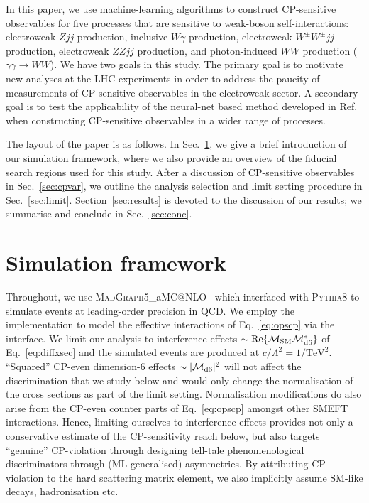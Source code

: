 \documentclass[twocolumn,preprintnumbers,superscriptaddress,nofootinbib,aps,prd,floatfix]{revtex4}
\makeatletter
\newcommand{\mg}{\textsc{MadGraph5\_}aMC@NLO}
\newcommand{\pythia}{\textsc{Pythia8}}
\makeatother
\begin{document}
In this paper, we use machine-learning algorithms to construct CP-sensitive observables for five processes that are sensitive to weak-boson self-interactions: electroweak $Zjj$ production, inclusive $W\gamma$ production, electroweak $W^\pm W^\pm jj$ production, electroweak $ZZjj$ production, and photon-induced $WW$ production ($\gamma\gamma\rightarrow WW$). We have two goals in this study. The primary goal is to motivate new analyses at the LHC experiments in order to address the paucity of measurements of CP-sensitive observables in the electroweak sector. A secondary goal is to test the applicability of the neural-net based method developed in Ref.~\cite{Bhardwaj:2021ujv} when constructing CP-sensitive observables in a wider range of processes. 

The layout of the paper is as follows. In Sec.~\ref{sec:mc}, we give a brief 
introduction of our simulation framework, where we also provide an overview 
of the fiducial search regions used for this study.
After a discussion 
of CP-sensitive observables in Sec.~\ref{sec:cpvar}, we outline the analysis 
selection and limit setting procedure in Sec.~\ref{sec:limit}. 
Section~\ref{sec:results} is devoted to the discussion of our results; we 
summarise and conclude in Sec.~\ref{sec:conc}.

\section{Simulation framework}
\label{sec:mc}
Throughout, we use \mg{}~\cite{Alwall:2014hca} which interfaced with \pythia{} \cite{Sjostrand:2007gs,Sjostrand:2014zea} to simulate events at leading-order precision in QCD. We employ the {}~\cite{Brivio:2017btx,Brivio:2020onw} implementation to model the effective interactions of Eq.~\eqref{eq:opscp} via the {}~\cite{Degrande:2011ua} interface. We limit our analysis to interference effects $\sim \hbox{Re}\{{\cal{M}}_{\text{SM}}{\cal{M}}_{\text{d6}}^\ast \}$ of Eq.~\eqref{eq:diffxsec} and the simulated events are produced at $c/\Lambda^2 = 1/\text{TeV}^2$.
``Squared'' CP-even dimension-6 effects $\sim |{\cal{M}}_{\text{d6}}|^{2}$ will not affect the discrimination that we study below and would only change the normalisation of the cross sections as part of the limit setting. Normalisation modifications do also arise from the CP-even counter parts of Eq.~\eqref{eq:opscp} amongst other SMEFT interactions. Hence, limiting ourselves to interference effects provides not only a conservative estimate of the CP-sensitivity reach below, but also targets ``genuine'' CP-violation through designing tell-tale phenomenological discriminators through (ML-generalised) asymmetries. By attributing CP violation to the hard scattering matrix element, we also implicitly assume SM-like decays, hadronisation etc.
\end{document}

